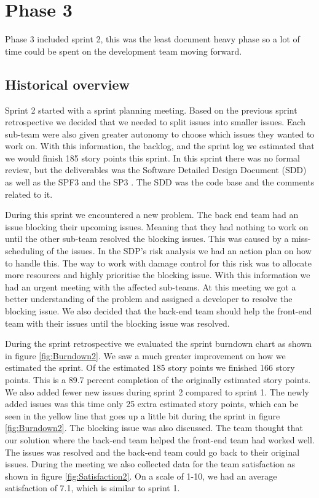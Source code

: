 \documentclass{article}
\begin{document}
\section{Phase 3} %
Phase 3 included sprint 2, this was the least document heavy phase so a lot of time could be spent on the development team moving forward. 

\subsection{Historical overview}
Sprint 2 started with a sprint planning meeting. Based on the previous sprint retrospective we decided that we needed to split issues into smaller issues. Each sub-team were also given greater autonomy to choose which issues they wanted to work on. With this information, the backlog, and the sprint log we estimated that we would finish 185 story points this sprint. In this sprint there was no formal review, but the deliverables was the Software Detailed Design Document (SDD) as well as the SPF3 \cite{SPF3} and the SP3 \cite{SP3}. The SDD was the code base and the comments related to it.  

During this sprint we encountered a new problem. The back end team had an issue blocking their upcoming issues. Meaning that they had nothing to work on until the other sub-team resolved the blocking issues. This was caused by a miss-scheduling of the issues. In the SDP's risk analysis we had an action plan on how to handle this. The way to work with damage control for this risk was to allocate more resources and highly prioritise the blocking issue. With this information we had an urgent meeting with the affected sub-teams. At this meeting we got a better understanding of the problem and assigned a developer to resolve the blocking issue. We also decided that the back-end team should help the front-end team with their issues until the blocking issue was resolved. 

During the sprint retrospective we evaluated the sprint burndown chart as shown in figure \ref{fig:Burndown2}. We saw a much greater improvement on how we estimated the sprint. Of the estimated 185 story points we finished 166 story points. This is a 89.7 percent completion of the originally estimated story points. We also added fewer new issues during sprint 2 compared to sprint 1. The newly added issues was this time only 25 extra estimated story points, which can be seen in the yellow line that goes up a little bit during the sprint in figure \ref{fig:Burndown2}. The blocking issue was also discussed. The team thought that our solution where the back-end team helped the front-end team had worked well. The issues was resolved and the back-end team could go back to their original issues. During the meeting we also collected data for the team satisfaction as shown in figure \ref{fig:Satisfaction2}. On a scale of 1-10, we had an average satisfaction of 7.1, which is similar to sprint 1.
\end{document}
